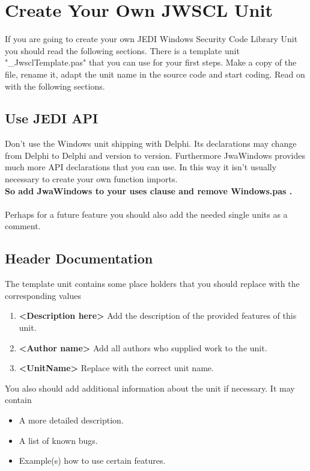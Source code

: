 \documentclass[a4paper,oneside,10pt]{article}
\begin{document}
\section{Create Your Own JWSCL Unit}
If you are going to create your own JEDI Windows Security Code Library Unit you should read the following sections. There is a template unit "\_JwsclTemplate.pas" that you can use for your first steps. Make a copy of the file, rename it, adapt the unit name in the source code and start coding. Read on with the following sections.

\subsection{Use JEDI API}
Don't use the Windows unit shipping with Delphi. Its declarations may change from Delphi to Delphi and version to version. Furthermore JwaWindows provides much more API declarations that you can use. In this way it isn't usually necessary to create your own function imports.\\
\textbf{So add JwaWindows to your uses clause and remove Windows.pas .}\\\\

Perhaps for a future feature you should also add the needed single units as a comment. 


\subsection{Header Documentation}
The template unit contains some place holders that you should replace with the corresponding values
\begin{enumerate}
	\item \textbf{<Description here>} Add the description of the provided features of this unit.
  \item \textbf{<Author name>} Add all authors who supplied work to the unit.
  \item \textbf{<UnitName>} Replace with the correct unit name.
\end{enumerate}
You also should add additional information about the unit if necessary. It may contain
\begin{itemize}
  \item A more detailed description.
  \item A list of known bugs.
  \item Example(s) how to use certain features.  
\end{itemize}
\end{document}
